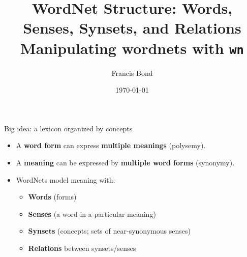 \documentclass[aspectratio=169]{beamer}
\title{WordNet Structure: Words, Senses, Synsets, and Relations
\\ Manipulating wordnets with \texttt{wn}}
\author{Francis Bond}
\date{\today}
\begin{document}
\begin{frame}
  \titlepage
\end{frame}

\begin{frame}{Big idea: a lexicon organized by concepts}
\begin{itemize}
  \item A \textbf{word form} can express \textbf{multiple meanings} (polysemy).
  \item A \textbf{meaning} can be expressed by \textbf{multiple word forms} (synonymy).
  \item WordNets model meaning with:
    \begin{itemize}
      \item \textbf{Words} (forms)
      \item \textbf{Senses} (a word-in-a-particular-meaning)
      \item \textbf{Synsets} (concepts; sets of near-synonymous senses)
      \item \textbf{Relations} between synsets/senses
    \end{itemize}
\end{itemize}
\end{frame}
\end{document}
